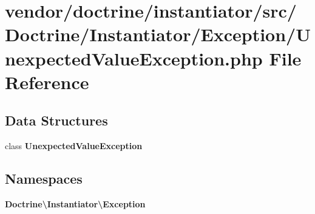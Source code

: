 \section{vendor/doctrine/instantiator/src/\+Doctrine/\+Instantiator/\+Exception/\+Unexpected\+Value\+Exception.php File Reference}
\label{_unexpected_value_exception_8php}
\subsection*{Data Structures}
\begin{DoxyCompactItemize}
\item 
class {\bf Unexpected\+Value\+Exception}
\end{DoxyCompactItemize}
\subsection*{Namespaces}
\begin{DoxyCompactItemize}
\item 
 {\bf Doctrine\textbackslash{}\+Instantiator\textbackslash{}\+Exception}
\end{DoxyCompactItemize}
